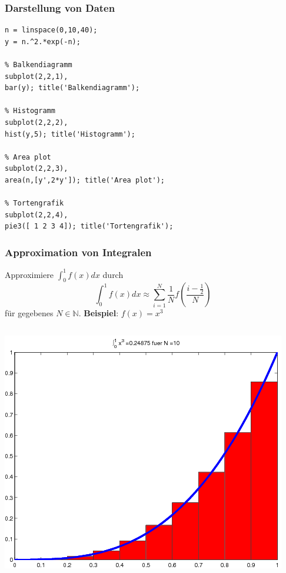 % 
% 
\begin{frame}[fragile]\frametitle{Darstellung von Daten}
\begin{lstlisting}
n = linspace(0,10,40);
y = n.^2.*exp(-n);

% Balkendiagramm
subplot(2,2,1),
bar(y); title('Balkendiagramm');

% Histogramm
subplot(2,2,2),
hist(y,5); title('Histogramm');

% Area plot
subplot(2,2,3),
area(n,[y',2*y']); title('Area plot');

% Tortengrafik
subplot(2,2,4),
pie3([ 1 2 3 4]); title('Tortengrafik');
\end{lstlisting}
\end{frame}
% 
% 
\begin{frame}[fragile]\frametitle{Approximation von Integralen}
Approximiere $\int_0^1 f(x) dx$ durch
{\tiny \[ \int_0^1 f(x) dx \approx  \sum_{i=1}^{N} \frac{1}{N} f \left(
\frac{i-\frac{1}{2}}{N} \right ) \]}
für gegebenes $N \in \mathbb{N}$. \textbf{Beispiel}: $f(x)=x^3$
\begin{columns}[t]
\includegraphics[width=\textwidth]{./figures/integral_N=10} 

\end{columns}
\end{frame}
